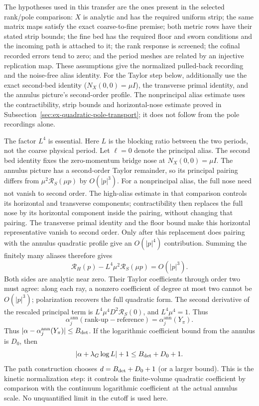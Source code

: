 The hypotheses used in this transfer are the ones present in the selected
rank/pole comparison: $X$ is analytic and has the required uniform strip;
the same matrix maps satisfy the exact coarse-to-fine premise; both metric
rows have their stated strip bounds; the fine bed has the required floor
and sworn conditions and the incoming path is attached to it; the rank
response is screened; the
cofinal recorded errors tend to zero; and the period meshes are related by
an injective replication map. These assumptions give the
normalized pulled-back recording and the noise-free alias identity. For the
Taylor step below, additionally use the exact second-bed identity
($N_X(0,0)=\mu I$), the transverse primal identity, and the annulus
picture's second-order profile. The nonprincipal alias estimate uses the
contractibility, strip bounds and horizontal-nose estimate proved in
Subsection~\ref{sec:ex-quadratic-pole-transport}; it does not follow from
the pole recordings alone.

The factor $L^4$ is essential. Here $L$ is the blocking ratio between the two periods, not the coarse physical period. Let $\ell=0$ denote the principal alias.
The second bed identity fixes the zero-momentum bridge nose at
$N_X(0,0)=\mu I$. The annulus picture has a second-order Taylor remainder,
so its principal pairing differs from $\mu^2\mathcal R_S(\mu p)$ by
$O(|p|^3)$. For a nonprincipal alias, the full nose need not vanish to second order. The
high-alias estimate in that comparison controls its horizontal and transverse components;
contractibility then replaces the full nose by its horizontal component
inside the pairing, without changing that pairing. The transverse primal
identity and the floor bound make this horizontal representative vanish to
second order. Only after this replacement does pairing with the annulus
quadratic profile give an $O(|p|^4)$ contribution. Summing the finitely many
aliases therefore gives
\[
 \mathcal R_H(p)-L^4\mu^2\mathcal R_S(\mu p)=O(|p|^3).
\]
Both sides are analytic near zero. Their Taylor coefficients through order
two must agree: along each ray, a nonzero coefficient of degree at most
two cannot be $O(|p|^3)$; polarization recovers the full quadratic form.
The second derivative of the rescaled principal term is
$L^4\mu^4D^2\mathcal R_S(0)$, and $L^4\mu^4=1$. Thus
\[
 \alpha^{\mathrm{ann}}_j(\text{rank-up}-\text{reference})=\alpha^{\mathrm{ann}}_j(Y_\pi).
\]
Thus $|\alpha-\alpha^{\mathrm{ann}}_j(Y_\pi)|\leq B_{\rm det}$. If the logarithmic
coefficient bound from the annulus is $D_0$, then
\[
 |\alpha+\lambda_G\log L|+1
 \leq B_{\rm det}+D_0+1.
\]
The path construction chooses $d=B_{\rm det}+D_0+1$ (or a larger bound).
This is the kinetic normalization step: it controls the finite-volume
quadratic coefficient by comparison with the continuum logarithmic
coefficient at the actual annulus scale. No unquantified limit in the
cutoff is used here.


